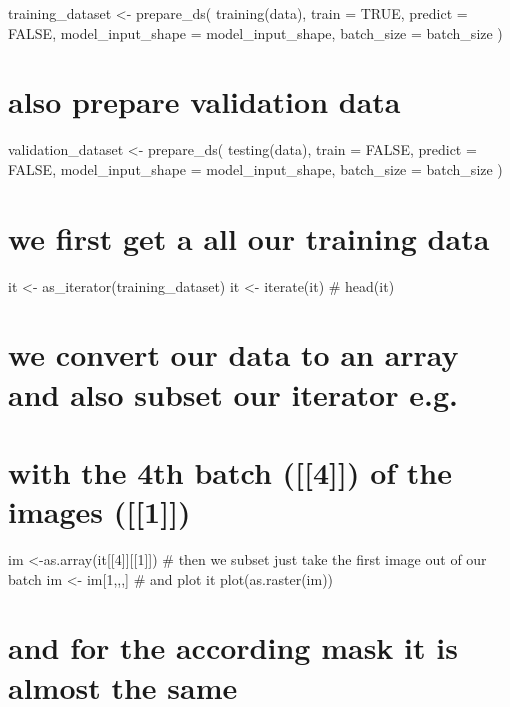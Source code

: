 \documentclass[
]{article}
\begin{document}
{{{{training\_dataset \textless- prepare\_ds( training(data), train = TRUE,
predict = FALSE, model\_input\_shape = model\_input\_shape, batch\_size
= batch\_size )

\hypertarget{also-prepare-validation-data}{%
\section{also prepare validation
data}\label{also-prepare-validation-data}}

validation\_dataset \textless- prepare\_ds( testing(data), train =
FALSE, predict = FALSE, model\_input\_shape = model\_input\_shape,
batch\_size = batch\_size )

\hypertarget{we-first-get-a-all-our-training-data}{%
\section{we first get a all our training
data}\label{we-first-get-a-all-our-training-data}}

it \textless- as\_iterator(training\_dataset) it \textless- iterate(it)
\# head(it)

\hypertarget{we-convert-our-data-to-an-array-and-also-subset-our-iterator-e.g.}{%
\section{we convert our data to an array and also subset our iterator
e.g.~}\label{we-convert-our-data-to-an-array-and-also-subset-our-iterator-e.g.}}

\hypertarget{with-the-4th-batch-4-of-the-images-1}{%
\section{with the 4th batch ({[}{[}4{]}{]}) of the images
({[}{[}1{]}{]})}\label{with-the-4th-batch-4-of-the-images-1}}

im \textless-as.array(it{[}{[}4{]}{]}{[}{[}1{]}{]}) \# then we subset
just take the first image out of our batch im \textless- im{[}1,,,{]} \#
and plot it plot(as.raster(im))

\hypertarget{and-for-the-according-mask-it-is-almost-the-same}{%
\section{and for the according mask it is almost the
same}\label{and-for-the-according-mask-it-is-almost-the-same}}

}}}}
\end{document}

